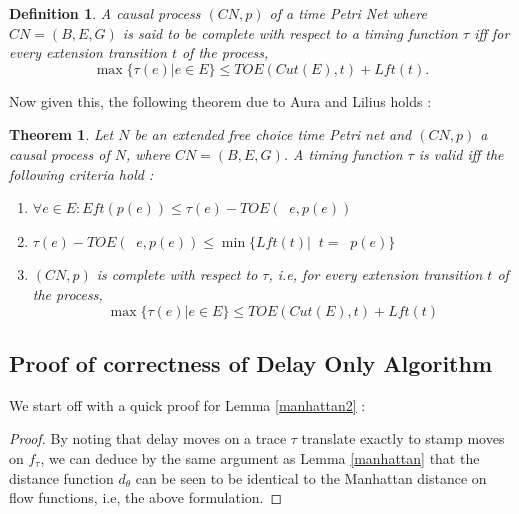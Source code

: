 \documentclass[conference]{IEEEtran}
\DeclareMathOperator*{\pre}{^\bullet}
\newtheorem{theorem}{Theorem}
\newtheorem{definition}{Definition}
\begin{document}
	\begin{definition} A causal process $(CN, p)$ of a time Petri Net where $CN = (B, E, G)$ is said to be \textit{complete} with respect to a timing function $\tau$ iff for every extension transition $t$ of the process, $$\max\{\tau(e)| e \in E\} \leq TOE(Cut(E), t) + Lft(t).$$
	\end{definition}
	
	Now given this, the following theorem due to Aura and Lilius \cite{AL97} holds : 
	
	\begin{theorem}\label{thm35}
		Let $N$ be an extended free choice time Petri net and $(CN, p)$ a causal process of $N$, where $CN = (B, E, G)$. A timing function $\tau$ is valid iff the following criteria hold : 
		
		\begin{enumerate}
			\item$ \forall e \in E :  Eft(p(e)) \leq \tau(e) - TOE(\pre e, p(e))$
			\item $\tau(e) - TOE(\pre e, p(e)) \leq  \min \{Lft(t) | \pre t = \pre p(e)\}$
			\item $(CN, p)$ is complete with respect to $\tau$, i.e, for every extension transition $t$ of the process, $$\max\{\tau(e)| e \in E\} \leq TOE(Cut(E), t) + Lft(t)$$
			
		\end{enumerate}
	\end{theorem}
	
	\subsection{Proof of correctness of Delay Only Algorithm}
	We start off with a quick proof for Lemma \ref{manhattan2} : 
	
	\begin{proof}
		By noting that delay moves on a trace $\tau$ translate exactly to stamp moves on $f_\tau$, we can deduce by the same argument as Lemma \ref{manhattan} that the distance function $d_\theta$ can be seen to be identical to the Manhattan distance on flow functions, i.e, the above formulation. 
	\end{proof}
	
\end{document}
